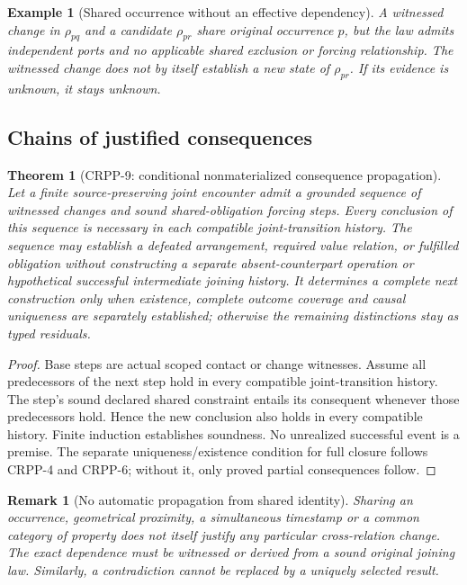 \documentclass[11pt]{article}
\newtheorem{theorem}[definition]{Theorem}
\newtheorem{remark}[definition]{Remark}
\newtheorem{example}[definition]{Example}
\begin{document}
\begin{example}[Shared occurrence without an effective dependency]
A witnessed change in $\rho_{pq}$ and a candidate
$\rho_{pr}$ share original occurrence $p$, but the
law admits independent ports and no applicable shared
exclusion or forcing relationship. The witnessed change
does not by itself establish a new state of $\rho_{pr}$.
If its evidence is unknown, it stays unknown.
\end{example}

\subsection{Chains of justified consequences}
\begin{theorem}[CRPP-9: conditional nonmaterialized consequence propagation]
Let a finite source-preserving joint encounter admit
a grounded sequence of witnessed changes and sound
shared-obligation forcing steps. Every conclusion of
this sequence is necessary in each compatible
joint-transition history. The sequence may establish
a defeated arrangement, required value relation,
or fulfilled obligation without constructing a separate
absent-counterpart operation or hypothetical successful
intermediate joining history. It determines a
\emph{complete next construction} only when existence,
complete outcome coverage and causal uniqueness are
separately established; otherwise the remaining
distinctions stay as typed residuals.
\end{theorem}
\begin{proof}
Base steps are actual scoped contact or change witnesses.
Assume all predecessors of the next step hold in every
compatible joint-transition history. The step's
sound declared shared constraint entails its consequent
whenever those predecessors hold. Hence the new conclusion
also holds in every compatible history. Finite induction
establishes soundness. No unrealized successful event
is a premise. The separate uniqueness/existence
condition for full closure follows CRPP-4 and CRPP-6;
without it, only proved partial consequences follow.
\end{proof}

\begin{remark}[No automatic propagation from shared identity]
Sharing an occurrence, geometrical proximity, a simultaneous
timestamp or a common category of property does not
itself justify any particular cross-relation change.
The exact dependence must be witnessed or derived from
a sound original joining law. Similarly, a contradiction
cannot be replaced by a uniquely selected result.
\end{remark}
\end{document}

